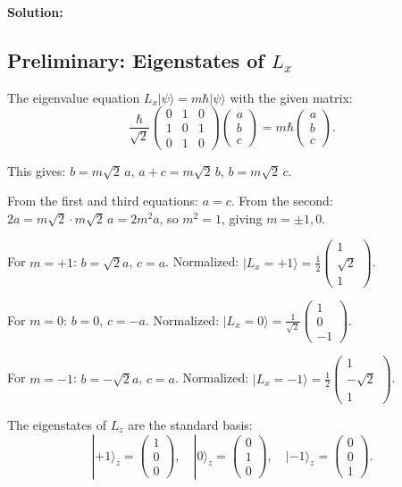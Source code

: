 \documentclass[12pt]{article}
\begin{document}
\bigskip
\textbf{Solution:}

\subsection*{Preliminary: Eigenstates of $L_x$}

The eigenvalue equation $L_x|\psi\rangle = m\hbar|\psi\rangle$ with the given matrix:
\[
\frac{\hbar}{\sqrt{2}}\begin{pmatrix} 0 & 1 & 0 \\ 1 & 0 & 1 \\ 0 & 1 & 0 \end{pmatrix}\begin{pmatrix} a \\ b \\ c \end{pmatrix} = m\hbar\begin{pmatrix} a \\ b \\ c \end{pmatrix}.
\]

This gives: $b = m\sqrt{2}\,a$, $a + c = m\sqrt{2}\,b$, $b = m\sqrt{2}\,c$.

From the first and third equations: $a = c$. From the second: $2a = m\sqrt{2}\cdot m\sqrt{2}\,a = 2m^2 a$, so $m^2 = 1$, giving $m = \pm 1, 0$.

For $m = +1$: $b = \sqrt{2}a$, $c = a$. Normalized: $|L_x = +1\rangle = \frac{1}{2}\begin{pmatrix}1 \\ \sqrt{2} \\ 1\end{pmatrix}$.

For $m = 0$: $b = 0$, $c = -a$. Normalized: $|L_x = 0\rangle = \frac{1}{\sqrt{2}}\begin{pmatrix}1 \\ 0 \\ -1\end{pmatrix}$.

For $m = -1$: $b = -\sqrt{2}a$, $c = a$. Normalized: $|L_x = -1\rangle = \frac{1}{2}\begin{pmatrix}1 \\ -\sqrt{2} \\ 1\end{pmatrix}$.

The eigenstates of $L_z$ are the standard basis:
\[
|+1\rangle_z = \begin{pmatrix}1\\0\\0\end{pmatrix}, \quad |0\rangle_z = \begin{pmatrix}0\\1\\0\end{pmatrix}, \quad |-1\rangle_z = \begin{pmatrix}0\\0\\1\end{pmatrix}.
\]
\end{document}
